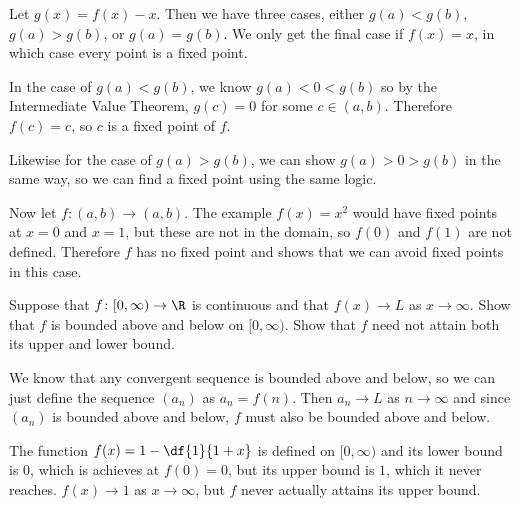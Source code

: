 \documentclass[a4paper]{article}
\begin{document}
Let $g(x) = f(x) - x$. Then we have three cases, either $g(a) < g(b)$, $g(a) > g(b)$, or $g(a) = g(b)$. We only get the final case if $f(x) = x$, in which case every point is a fixed point.

In the case of $g(a) < g(b)$, we know $g(a) < 0 < g(b)$
so by the Intermediate Value Theorem, $g(c) = 0$ for some $c \in (a, b)$. Therefore $f(c) = c$, so $c$ is a fixed point of $f$.

Likewise for the case of $g(a) > g(b)$, we can show $g(a) > 0 > g(b)$ in the same way, so we can find a fixed point using the same logic.

Now let $f : (a, b) \to (a, b)$. The example $f(x) = x^2$ would have fixed points at $x=0$ and $x=1$, but these are not in the domain, so $f(0)$ and $f(1)$ are not defined. Therefore $f$ has no fixed point and shows that we can avoid fixed points in this case.


\begin{questionbody}
Suppose that $f \colon [0, \infty) \to \R$ is continuous and that $f(x) \to L$ as $x \to \infty$. Show that $f$ is bounded above and below on $[0, \infty)$. Show that $f$ need not attain both its upper and lower bound.
\end{questionbody}

We know that any convergent sequence is bounded above and below, so we can just define the sequence $(a_n)$ as $a_n = f(n)$. Then $a_n \to L$ as $n \to \infty$ and since $(a_n)$ is bounded above and below, $f$ must also be bounded above and below.

The function $f(x) = 1 - \df{1}{1+x}$ is defined on $[0, \infty)$ and its lower bound is $0$, which is achieves at $f(0) = 0$, but its upper bound is $1$, which it never reaches. $f(x) \to 1$ as $x \to \infty$, but $f$ never actually attains its upper bound.
\end{document}
